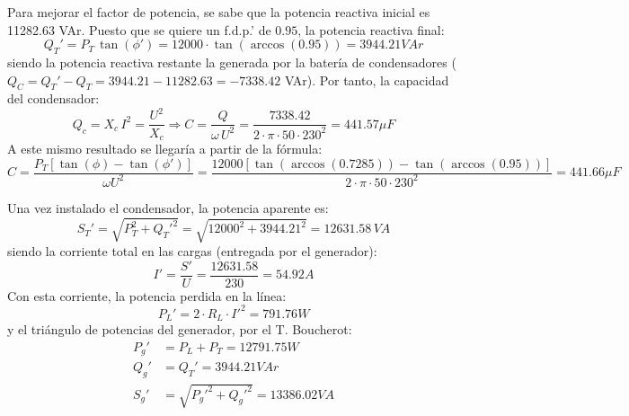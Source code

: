 Para mejorar el factor de potencia, se sabe que la potencia reactiva
inicial es 11282.63 VAr. Puesto que se quiere un f.d.p.' de $0.95$, la
potencia reactiva final:
\begin{equation*}
  Q_T'=P_T\,\tan(\phi')=12000\cdot \tan(\arccos(0.95))=3944.21 VAr
\end{equation*} siendo
la potencia reactiva restante la generada por la batería de
condensadores ($Q_C=Q_T'-Q_T=3944.21-11282.63=-7338.42$ VAr). Por
tanto, la capacidad del condensador:
\begin{equation*}
  Q_c=X_c\,I^2=\dfrac{U^2}{X_c}\Rightarrow
  C=\dfrac{Q}{\omega\,U^2}=\dfrac{7338.42}{2\cdot\pi\cdot 50\cdot
    230^2}=441.57 \mu F
\end{equation*} A este
mismo resultado se llegaría a partir de la fórmula:
\begin{equation*}
  C=\frac{P_T \left[\tan (\phi) - \tan (\phi')\right]}{\omega
    U^2}=\dfrac{12000\left[\tan (\arccos(0.7285)) - \tan
      (\arccos(0.95))\right]}{2\cdot\pi\cdot 50\cdot 230^2}=441.66 \mu F
\end{equation*}

Una vez instalado el condensador, la potencia aparente es:
\begin{equation*}
  S_T'=\sqrt{P_T^2+Q_T'^2}=\sqrt{12000^2+3944.21^2}=12631.58\,VA
\end{equation*} siendo
la corriente total en las cargas (entregada por el generador):
\begin{equation*}
  I'=\dfrac{S'}{U}=\dfrac{12631.58}{230}=54.92 A
\end{equation*} Con esta
corriente, la potencia perdida en la línea:
\begin{equation*}
  P_L'=2 \cdot R_L \cdot I'^2= 791.76W
\end{equation*} y el
triángulo de potencias del generador, por el T. Boucherot:
\begin{align*}
  P_g'&=P_L+P_T=12791.75 W\\ Q_g'&=Q_T'=3944.21 VAr\\
  S_g'&=\sqrt{P_g'^2+Q_g'^2}=13386.02 VA
\end{align*}

